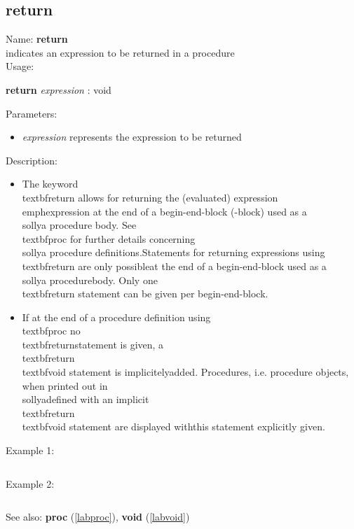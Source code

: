 \subsection{return}
\label{labreturn}
\noindent Name: \textbf{return}\\
indicates an expression to be returned in a procedure\\
\noindent Usage: 
\begin{center}
\textbf{return} \emph{expression} : \textsf{void}\\
\end{center}
Parameters: 
\begin{itemize}
\item \emph{expression} represents the expression to be returned
\end{itemize}
\noindent Description: \begin{itemize}

\item The keyword \\textbf{return} allows for returning the (evaluated) expression\n   \\emph{expression} at the end of a begin-end-block ({}-block) used as a\n   \\sollya procedure body. See \\textbf{proc} for further details concerning\n   \\sollya procedure definitions.\n     \n   Statements for returning expressions using \\textbf{return} are only possible\n    at the end of a begin-end-block used as a \\sollya procedure\n    body. Only one \\textbf{return} statement can be given per begin-end-block.\n
\item If at the end of a procedure definition using \\textbf{proc} no \\textbf{return}\n   statement is given, a \\textbf{return} \\textbf{void} statement is implicitely\n   added. Procedures, i.e. procedure objects, when printed out in \\sollya\n   defined with an implicit \\textbf{return} \\textbf{void} statement are displayed with\n   this statement explicitly given.\n\end{itemize}
\noindent Example 1: 
\begin{center}\begin{minipage}{15cm}\begin{Verbatim}[frame=single]
\end{Verbatim}
\end{minipage}\end{center}
\noindent Example 2: 
\begin{center}\begin{minipage}{15cm}\begin{Verbatim}[frame=single]
\end{Verbatim}
\end{minipage}\end{center}
See also: \textbf{proc} (\ref{labproc}), \textbf{void} (\ref{labvoid})
